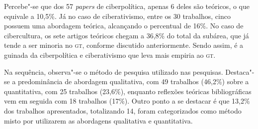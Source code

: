 {

Percebe"-se que dos 57 \textit{papers} de ciberpolítica, apenas
6 deles são teóricos, o que equivale a 10,5\%. Já no caso de
ciberativismo, entre os 30 trabalhos, cinco possuem uma abordagem
teórica, alcançando o percentual de 16\%. No caso de cibercultura, os
sete artigos teóricos chegam a 36,8\% do total da subárea, que já tende
a ser minoria no \textsc{gt}, conforme discutido anteriormente. Sendo assim, é a
guinada da ciberpolítica e ciberativismo que leva mais empiria ao \textsc{gt}.

Na sequência, observa"-se o método de pesquisa utilizado nas pesquisas.
Destaca"-se a predominância de abordagem qualitativa, com 49 trabalhos (46,2\%) sobre a
quantitativa, com 25 trabalhos (23,6\%), enquanto reflexões teóricas bibliográficas vem em
seguida com 18 trabalhos (17\%). Outro ponto a se destacar é que 13,2\% dos trabalhos
apresentados, totalizando 14, foram categorizados como método misto por utilizarem as
abordagens qualitativa e quantitativa.

}
